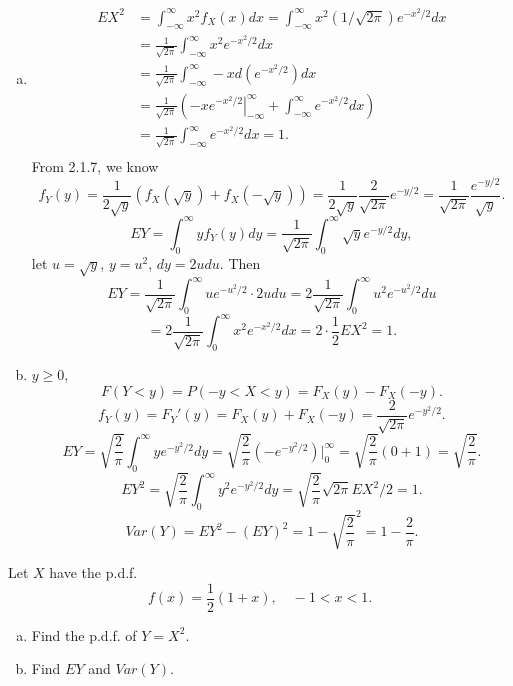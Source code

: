 \documentclass[14pt]{elegantbook}
\begin{document}
    \begin{solution}
        \begin{enumerate}[(a)]
            \item \begin{align*}
                EX^2&=\int_{-\infty}^\infty x^2f_X(x)dx=\int_{-\infty}^\infty x^2(1/\sqrt{2\pi})e^{-x^2/2}dx\\
                &=\frac{1}{\sqrt{2\pi}}\int_{-\infty}^\infty x^2e^{-x^2/2}dx\\
                &=\frac{1}{\sqrt{2\pi}}\int_{-\infty}^\infty-xd(e^{-x^2/2})dx\\
                &=\frac{1}{\sqrt{2\pi}}\left(\left.-xe^{-x^2/2}\right|_{-\infty}^\infty+\int_{-\infty}^\infty e^{-x^2/2}dx\right)\\
                &=\frac{1}{\sqrt{2\pi}}\int_{-\infty}^\infty e^{-x^2/2}dx=1. \\
            \end{align*}
            From 2.1.7, we know 
            \[f_Y(y)=\frac{1}{2\sqrt{y}}(f_X(\sqrt{y})+f_X(-\sqrt{y}))=\frac{1}{2\sqrt{y}}\frac{2}{\sqrt{2\pi}}e^{-y/2}=\frac{1}{\sqrt{2\pi}}\frac{e^{-y/2}}{\sqrt{y}}. \]
            \[EY=\int_{0}^\infty yf_Y(y)dy=\frac{1}{\sqrt{2\pi}}\int_0^\infty \sqrt{y}e^{-y/2}dy, \]
            let $u=\sqrt{y}$, $y=u^2$, $dy=2udu$. Then 
            \[EY=\frac{1}{\sqrt{2\pi}}\int_0^\infty ue^{-u^2/2}\cdot 2u du=2\frac{1}{\sqrt{2\pi}}\int_0^\infty u^2e^{-u^2/2}du\]
            \[=2\frac{1}{\sqrt{2\pi}}\int_0^\infty x^2e^{-x^2/2}dx=2\cdot \frac{1}{2}EX^2=1. \]
            \item $y\geq0$, 
            \[F(Y<y)=P(-y<X<y)=F_X(y)-F_X(-y). \]
            \[f_Y(y)=F_Y'(y)=F_X(y)+F_X(-y)=\frac{2}{\sqrt{2\pi}}e^{-y^2/2}. \]
            \[EY=\sqrt{\frac{2}{\pi}}\int_0^\infty ye^{-y^2/2}dy=\sqrt{\frac{2}{\pi}}(-e^{-y^2/2})|_0^\infty=\sqrt{\frac{2}{\pi}}(0+1)=\sqrt{\frac{2}{\pi}}. \]
            \[
                EY^2=\sqrt{\frac{2}{\pi}}\int_{0}^\infty y^2e^{-y^2/2}dy=\sqrt{\frac{2}{\pi}}\sqrt{2\pi}EX^2/2=1. \]
            \[
                Var(Y)=EY^2-(EY)^2=1-\sqrt{\frac{2}{\pi}}^2=1-\frac{2}{\pi}. 
            \]
        \end{enumerate}
    \end{solution}

    \setcounter{exer}{22}
    \begin{exercise}
        Let $X$ have the p.d.f. 
        \[f(x)=\frac{1}{2}(1+x), \quad -1<x<1 .\]
        \begin{enumerate}[(a)]
            \item Find the p.d.f. of $Y=X^2$. 
            \item Find $EY$ and $Var(Y)$. 
        \end{enumerate}
    \end{exercise}
\end{document}
